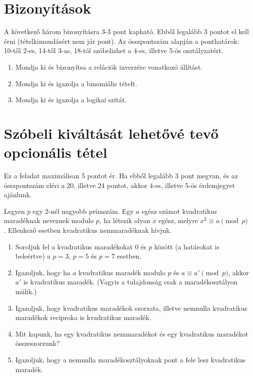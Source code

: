 \documentclass[11pt,a4paper]{article}
\begin{document}
\newpage
\section{Bizonyítások}
A következő három bizonyításra 3-3 pont kapható. Ebből legalább 3 pontot el kell érni (tételkimondásért nem jár pont).
Az összpontszám alapján a ponthatárok: 10-től 2-es, 14-től 3-as, 18-tól szóbelizhet a 4-es, illetve 5-ös osztályzatért.
\begin{enumerate}

\item Mondja ki és bizonyítsa a relációk inverzére vonatkozó állítást.
\item Mondja ki és igazolja a binomiális tételt.
\item Mondja ki és igazolja a logikai szitát.

\end{enumerate}

\section{Szóbeli kiváltását lehetővé tevő opcionális tétel}
Ez a feladat maximálisan 5 pontot ér. Ha ebből legalább 3 pont megvan, és az összpontszám eléri a 20, 
illetve 24 pontot, akkor 4-es, illetve 5-ös érdemjegyet ajánlunk.

Legyen $p$ egy 2-nél nagyobb prímszám. Egy $a$ egész számot kvadratikus
maradéknak neveznek modulo $p$, ha létezik olyan $x$ egész, melyre
$x^2 \equiv a \pmod p$. Ellenkező esetben kvadratikus nemmaradéknak hívjuk.

\begin{enumerate}

\item Soroljuk fel a kvadratikus maradékokat $0$ és $p$ között (a
határokat is beleértve) a $p=3$, $p=5$ és $p=7$ esetben.
\item Igazoljuk, hogy ha $a$ kvadratikus maradék modulo $p$ és
$a\equiv a' \pmod p$, akkor $a'$ is kvadratikus maradék. (Vagyis a
tulajdonság csak a maradékosztályon múlik.)
\item Igazoljuk, hogy kvadratikus maradékok szorzata, illetve nemnulla
kvadratikus maradékok reciproka is kvadratikus maradék.
\item Mit kapunk, ha egy kvadratikus nemmaradékot és egy kvadratikus
maradékot összeszorzunk?
\item Igazoljuk, hogy a nemnulla maradékosztályoknak pont a fele lesz
kvadratikus maradék.


\end{enumerate}
\end{document}
